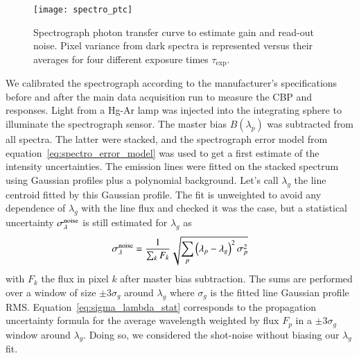 \begin{figure}[!h]
\centering
\texttt{[image: spectro\_ptc]}
\caption{Spectrograph photon transfer curve to estimate gain and read-out noise. Pixel variance from dark spectra is represented versus their averages for four different exposure times $\tau_{\mathrm{exp}}$.}\label{fig:spectro_ptc}
\end{figure}


We calibrated the spectrograph according to the manufacturer's specifications before and after the main data acquisition run to measure the CBP and \SD responses. Light from a Hg-Ar lamp was injected into the integrating sphere to illuminate the spectrograph sensor. The master bias $B(\lambda_p)$ was subtracted from all spectra. The latter were stacked, and the spectrograph error model from equation~\ref{eq:spectro_error_model} was used to get a first estimate of the intensity uncertainties. The emission lines were fitted on the stacked spectrum using Gaussian profiles plus a polynomial background. Let's call $\lambda_g$ the line centroid fitted by this Gaussian profile. The fit is unweighted to avoid any dependence of $\lambda_g$ with the line flux and checked it was the case, but a statistical uncertainty $\sigma_\lambda^{\rm noise}$ is still estimated for $\lambda_g$ as 
\begin{equation}\label{eq:sigma_lambda_stat}
    \sigma_\lambda^{\rm noise}= \dfrac{1}{\sum_k F_k} \sqrt{\sum_p \left(\lambda_p - \lambda_g\right)^2 \sigma_p^2}
\end{equation}
with $F_k$ the flux in pixel $k$ after master bias subtraction. The sums are performed over a window of size $\pm 3 \sigma_g$ around $\lambda_g$ where $\sigma_g$ is the fitted line Gaussian profile RMS. Equation~\ref{eq:sigma_lambda_stat} corresponds to the propagation uncertainty formula for the average wavelength weighted by flux $F_p$ in a $\pm 3 \sigma_g$  window around $\lambda_g$. Doing so, we considered the shot-noise without biasing our $\lambda_g$ fit.

